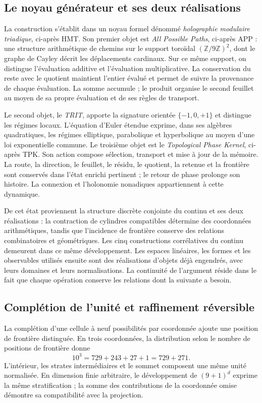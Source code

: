 \subsection*{Le noyau générateur et ses deux réalisations}
La construction s’établit dans un noyau formel dénommé \emph{holographie modulaire triadique}, ci-après HMT. Son premier objet est \emph{All Possible Paths}, ci-après APP : une structure arithmétique de chemins sur le support toroïdal \((\mathbb Z/9\mathbb Z)^2\), dont le graphe de Cayley décrit les déplacements cardinaux. Sur ce même support, on distingue l’évaluation additive et l’évaluation multiplicative. La conservation du reste avec le quotient maintient l’entier évalué et permet de suivre la provenance de chaque évaluation. La somme accumule ; le produit organise le second feuillet au moyen de sa propre évaluation et de ses règles de transport.


Le second objet, le \emph{TRIT}, apporte la signature orientée \(\{-1,0,+1\}\) et distingue les régimes locaux. L’équation d’Euler étendue exprime, dans ses algèbres quadratiques, les régimes elliptique, parabolique et hyperbolique au moyen d’une loi exponentielle commune. Le troisième objet est le \emph{Topological Phase Kernel}, ci-après TPK. Son action compose sélection, transport et mise à jour de la mémoire. La route, la direction, le feuillet, le résidu, le quotient, la retenue et la frontière sont conservés dans l’état enrichi pertinent ; le retour de phase prolonge son histoire. La connexion et l’holonomie nonadiques appartiennent à cette dynamique.

De cet état proviennent la structure discrète conjointe du continu et ses deux réalisations : la contraction de cylindres compatibles détermine des coordonnées arithmétiques, tandis que l'incidence de frontière conserve des relations combinatoires et géométriques. Les cinq constructions corrélatives du continu demeurent dans ce même développement. Les espaces linéaires, les formes et les observables utilisés ensuite sont des réalisations d'objets déjà engendrés, avec leurs domaines et leurs normalisations. La continuité de l'argument réside dans le fait que chaque opération conserve les relations dont la suivante a besoin.

\subsection*{Complétion de l’unité et raffinement réversible}
La complétion d'une cellule à neuf possibilités par coordonnée ajoute une position de frontière distinguée. En trois coordonnées, la distribution selon le nombre de positions de frontière donne
\[
10^3=729+243+27+1=729+271.
\]
L’intérieur, les strates intermédiaires et le sommet composent une même unité normalisée. En dimension finie arbitraire, le développement de \((9+1)^d\) exprime la même stratification ; la somme des contributions de la coordonnée omise démontre sa compatibilité avec la projection.


